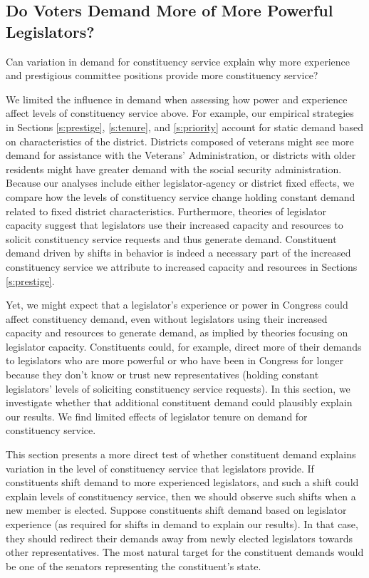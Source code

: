 \documentclass[12pt]{article}
\begin{document}

\subsection{Do Voters Demand More of More Powerful Legislators?}

Can variation in demand for constituency service explain why more experience and prestigious committee positions provide more constituency service? 

We limited the influence in demand when assessing how power and experience affect levels of constituency service above. For example, our empirical strategies in Sections \ref{s:prestige}, \ref{s:tenure}, and \ref{s:priority} account for static demand based on characteristics of the district. Districts composed of veterans might see more demand for assistance with the Veterans' Administration, or districts with older residents might have greater demand with the social security administration. Because our analyses include either legislator-agency or district fixed effects, we compare how the levels of constituency service change holding constant demand related to fixed district characteristics. Furthermore, theories of legislator capacity suggest that legislators use their increased capacity and resources to solicit constituency service requests and thus generate demand. Constituent demand driven by shifts in behavior is indeed a necessary part of the increased constituency service we attribute to increased capacity and resources in Sections \ref{s:prestige}.

Yet, we might expect that a legislator's experience or power in Congress could affect constituency demand, even without legislators using their increased capacity and resources to generate demand, as implied by theories focusing on legislator capacity. Constituents could, for example, direct more of their demands to legislators who are more powerful or who have been in Congress for longer because they don't know or trust new representatives (holding constant legislators' levels of soliciting constituency service requests). In this section, we investigate whether that additional constituent demand could plausibly explain our results. We find limited effects of legislator tenure on demand for constituency service. 

This section presents a more direct test of whether constituent demand explains variation in the level of constituency service that legislators provide. If constituents shift demand to more experienced legislators, and such a shift could explain levels of constituency service, then we should observe such shifts when a new member is elected. Suppose constituents shift demand based on legislator experience (as required for shifts in demand to explain our results). In that case, they should redirect their demands away from newly elected legislators towards other representatives. The most natural target for the constituent demands would be one of the senators representing the constituent's state.
\end{document}
